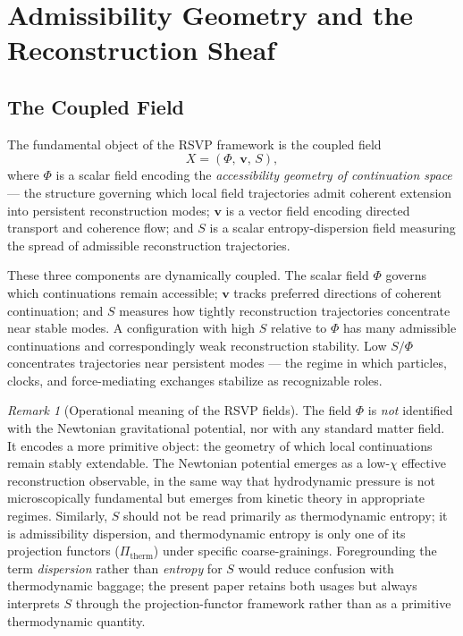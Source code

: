 \documentclass[11pt, a4paper]{article}
\theoremstyle{plain}
\theoremstyle{definition}
\theoremstyle{remark}
\newtheorem{remark}[theorem]{Remark}
\newcommand{\Xfield}{X = (\Phi,\,\mathbf{v},\,S)}
\newcommand{\Pitherm}{\Pi_{\mathrm{therm}}}
\begin{document}
\section{Admissibility Geometry and the Reconstruction Sheaf}
\label{sec:geometry}

\subsection{The Coupled Field}

The fundamental object of the RSVP framework is the coupled field
\begin{equation}
  \Xfield,
\end{equation}
where $\Phi$ is a scalar field encoding the \emph{accessibility geometry of
continuation space} --- the structure governing which local field trajectories admit
coherent extension into persistent reconstruction modes; $\mathbf{v}$ is a vector
field encoding directed transport and coherence flow; and $S$ is a scalar
entropy-dispersion field measuring the spread of admissible reconstruction
trajectories.

These three components are dynamically coupled. The scalar field $\Phi$ governs
which continuations remain accessible; $\mathbf{v}$ tracks preferred directions of
coherent continuation; and $S$ measures how tightly reconstruction trajectories
concentrate near stable modes. A configuration with high $S$ relative to $\Phi$ has
many admissible continuations and correspondingly weak reconstruction stability. Low
$S/\Phi$ concentrates trajectories near persistent modes --- the regime in which
particles, clocks, and force-mediating exchanges stabilize as recognizable roles.

\begin{remark}[Operational meaning of the RSVP fields]
\label{rem:operational}
The field $\Phi$ is \emph{not} identified with the Newtonian gravitational potential,
nor with any standard matter field. It encodes a more primitive object: the geometry
of which local continuations remain stably extendable. The Newtonian potential
emerges as a low-$\chi$ effective reconstruction observable, in the same way that
hydrodynamic pressure is not microscopically fundamental but emerges from kinetic
theory in appropriate regimes. Similarly, $S$ should not be read primarily as
thermodynamic entropy; it is admissibility dispersion, and thermodynamic entropy is
only one of its projection functors ($\Pitherm$) under specific coarse-grainings.
Foregrounding the term \emph{dispersion} rather than \emph{entropy} for $S$ would
reduce confusion with thermodynamic baggage; the present paper retains both usages
but always interprets $S$ through the projection-functor framework rather than as a
primitive thermodynamic quantity.
\end{remark}
\end{document}
